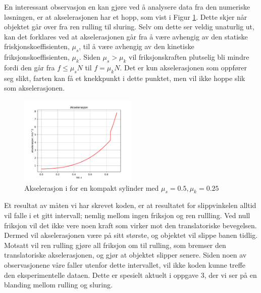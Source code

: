 \documentclass[5p]{elsarticle}
\begin{document}
	En interessant observasjon en kan gjøre ved å analysere data fra den numeriske løsningen, er at akselerasjonen har et hopp, som vist i Figur \ref{acc}. Dette skjer når objektet går over fra ren rulling til sluring. Selv om dette ser veldig unaturlig ut, kan det forklares ved at akselerasjonen går fra å være avhengig av den statiske friskjonskoeffisienten, $\mu_s$, til å være avhengig av den kinetiske friksjonskoeffisienten, $\mu_k$. Siden $\mu_s > \mu_k$ vil friksjonskraften plutselig bli mindre fordi den går fra $f \leq \mu_s N$ til $f = \mu_k N$. Det er kun akselerasjonen som oppfører seg slikt, farten kan få et knekkpunkt i dette punktet, men vil ikke hoppe slik som akselerasjonen.
	
	\begin{figure}[H]
	    \centering
	    \includegraphics[width=0.5\textwidth]{Figure_acc}
	    \caption{Akselerasjon i for en kompakt sylinder med $\mu_s = 0.5, \mu_k = 0.25$}
	    \label{acc}
	\end{figure}
	
	Et resultat av måten vi har skrevet koden, er at resultatet for slippvinkelen alltid vil falle i et gitt intervall; nemlig mellom ingen friksjon og ren rullling. Ved null friksjon vil det ikke vere noen kraft som virker mot den translatoriske bevegelsen. Dermed vil akselerasjonen være på sitt største, og objektet vil slippe banen tidlig. Motsatt vil ren rulling gjøre all friksjon om til rulling, som bremser den translatoriske akselerasjonen, og gjør at objektet slipper senere. Siden noen av observasjonene våre faller utenfor dette intervallet, vil ikke koden kunne treffe den eksperimentelle dataen. Dette er spesielt aktuelt i oppgave 3, der vi ser på en blanding mellom rulling og sluring. 
	
	
\end{document}
